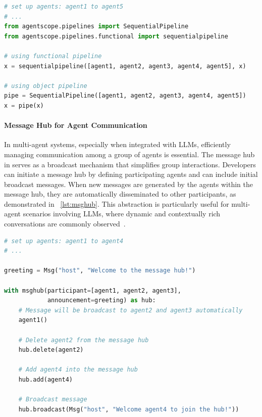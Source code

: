 \begin{lstlisting}[language=Python, float=h, caption={Using functional and object sequential pipeline to construct workflow in \ours.}, label={lst:pipeline}]
# set up agents: agent1 to agent5
# ...
from agentscope.pipelines import SequentialPipeline
from agentscope.pipelines.functional import sequentialpipeline

# using functional pipeline
x = sequentialpipeline([agent1, agent2, agent3, agent4, agent5], x)

# using object pipeline
pipe = SequentialPipeline([agent1, agent2, agent3, agent4, agent5])
x = pipe(x)
\end{lstlisting}  

\paragraph{Message Hub for Agent Communication}
In multi-agent systems, especially when integrated with LLMs, efficiently managing communication among a group of agents is essential. The message hub in \ours serves as a broadcast mechanism that simplifies group interactions. Developers can initiate a message hub by defining participating agents and can include initial broadcast messages. 
When new messages are generated by the agents within the message hub, they are automatically disseminated to other participants, as demonstrated in \lstlistingname~\ref{lst:msghub}. 
This abstraction is particularly useful for multi-agent scenarios involving LLMs, where dynamic and contextually rich conversations are commonly observed~\citep {du2023improving}.

\begin{lstlisting}[language=Python, float=h, caption={Using message hub with \ours.}, label={lst:msghub}]
# set up agents: agent1 to agent4
# ...

greeting = Msg("host", "Welcome to the message hub!")

with msghub(participant=[agent1, agent2, agent3], 
            announcement=greeting) as hub:
    # Message will be broadcast to agent2 and agent3 automatically
    agent1()
    
    # Delete agent2 from the message hub
    hub.delete(agent2)
    
    # Add agent4 into the message hub
    hub.add(agent4)
    
    # Broadcast message
    hub.broadcast(Msg("host", "Welcome agent4 to join the hub!"))
\end{lstlisting}  

